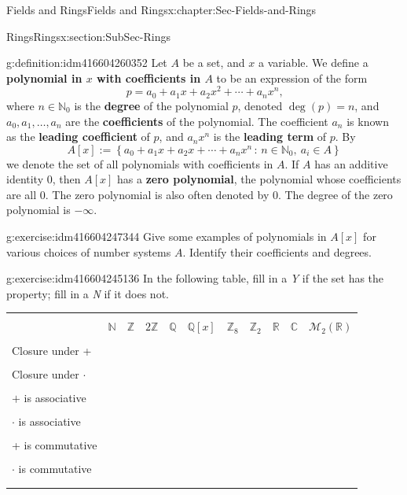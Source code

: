 \documentclass[oneside,10pt,]{book}
\newcommand{\terminology}[1]{\textbf{#1}}
\numberwithin{equation}{section}
\newcommand{\hrulethin}  {\noalign{\hrule height 0.04em}}
\newcommand{\setof}[2]{{\left\{#1\,\colon\,#2\right\}}}
\def\C{{\mathbb C}}
\def\Z{{\mathbb Z}}
\def\Q{{\mathbb Q}}
\def\N{{\mathbb N}}
\def\R{{\mathbb R}}
\begin{document}
\begin{chapterptx}{Fields and Rings}{}{Fields and Rings}{}{}{x:chapter:Sec-Fields-and-Rings}
\begin{sectionptx}{Rings}{}{Rings}{}{}{x:section:SubSec-Rings}
\begin{definition}{}{g:definition:idm416604260352}%
Let \(A\) be a set, and \(x\) a variable. We define a \terminology{polynomial in \(x\) with coefficients in \(A\)} to be an expression of the form%
\begin{equation*}
p = a_0 + a_1 x + a_2 x^2 + \cdots + a_n x^n\text{,}
\end{equation*}
where \(n\in \N_0\) is the \terminology{degree} of the polynomial \(p\), denoted \(\deg(p) = n\), and \(a_0,a_1,\ldots,
a_n\) are the \terminology{coefficients} of the polynomial. The coefficient \(a_n\) is known as the \terminology{leading coefficient} of \(p\), and \(a_n x^n\) is the \terminology{leading term} of \(p\). By%
\begin{equation*}
A[x] := \setof{a_0 + a_1 x + a_2 x + \cdots + a_n x^n}{n\in \N_0, \ a_i\in A}
\end{equation*}
we denote the set of all polynomials with coefficients in \(A\). If \(A\) has an additive identity \(0\), then \(A[x]\) has a \terminology{zero polynomial}, the polynomial whose coefficients are all \(0\). The zero polynomial is also often denoted by \(0\). The degree of the zero polynomial is \(-\infty\).%
\end{definition}
\begin{inlineexercise}{}{g:exercise:idm416604247344}%
Give some examples of polynomials in \(A[x]\) for various choices of number systems \(A\). Identify their coefficients and degrees.%
\end{inlineexercise}
\begin{inlineexercise}{}{g:exercise:idm416604245136}%
In the following table, fill in a \emph{Y} if the set has the property; fill in a \emph{N} if it does not.%
\begin{table}
\centering
\begin{tabular}{lllllllllll}
&&&&&&&&&&\tabularnewline\hrulethin
&\(\N\)&\(\Z\)&\(2\Z\)&\(\Q\)&\(\Q[x]\)&\(\Z_{8}\)&\(\Z_{2}\)&\(\R\)&\(\C\)&\(\mathcal{M}_2(\R)\)\tabularnewline[0pt]
&&&&&&&&&&\tabularnewline\hrulethin
Closure under +&&&&&&&&&&\tabularnewline[0pt]
&&&&&&&&&&\tabularnewline\hrulethin
Closure under \(\cdot\)&&&&&&&&&&\tabularnewline[0pt]
&&&&&&&&&&\tabularnewline\hrulethin
\(+\) is associative&&&&&&&&&&\tabularnewline[0pt]
&&&&&&&&&&\tabularnewline\hrulethin
\(\cdot\) is associative&&&&&&&&&&\tabularnewline[0pt]
&&&&&&&&&&\tabularnewline\hrulethin
+ is commutative&&&&&&&&&&\tabularnewline[0pt]
&&&&&&&&&&\tabularnewline\hrulethin
\(\cdot\) is commutative&&&&&&&&&&\tabularnewline[0pt]
&&&&&&&&&&\tabularnewline\hrulethin

\end{tabular}
\end{table}
\end{inlineexercise}
\end{sectionptx}
\end{chapterptx}
\end{document}
